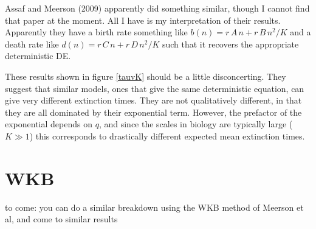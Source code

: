 \documentclass[a4paper,10pt]{article}
\numberwithin{equation}{section} %
\begin{document}
Assaf and Meerson (2009) apparently did something similar, though I cannot find that paper at the moment.  
All I have is my interpretation of their results.  
Apparently they have a birth rate something like $b(n)=r\,A\,n + r\,B\,n^2/K$ and a death rate like $d(n)=r\,C\,n + r\,D\,n^2/K$ such that it recovers the appropriate deterministic DE.  

These results shown in figure \ref{tauvK} should be a little disconcerting.  
They suggest that similar models, ones that give the same deterministic equation, can give very different extinction times.  
They are not qualitatively different, in that they are all dominated by their exponential term.  
However, the prefactor of the exponential depends on $q$, and since the scales in biology are typically large ($K\gg1$) this corresponds to drastically different expected mean extinction times.  


\section{WKB}
to come:  you can do a similar breakdown using the WKB method of Meerson et al, and come to similar results
\end{document}
